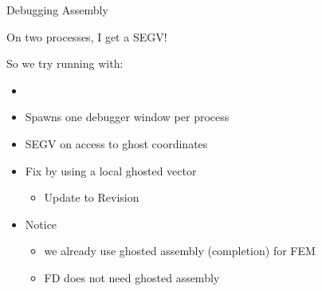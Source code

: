 \begin{frame}{Debugging Assembly}

\begin{center}
  On two processes, I get a {\red SEGV}!
\end{center}

So we try running with:
\begin{itemize}
  \item {}
  \pause
  \item Spawns one debugger window per process
  \pause
  \item SEGV on access to ghost coordinates
  \pause
  \item Fix by using a local ghosted vector
  \begin{itemize}
    \item Update to Revision {}
  \end{itemize}
  \pause
  \item Notice
  \begin{itemize}
    \item we already use ghosted assembly (completion) for FEM

    \item FD does not need ghosted assembly
  \end{itemize}
\end{itemize}
\end{frame}
